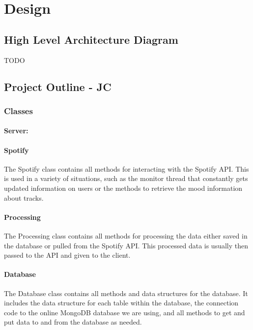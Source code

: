 \documentclass[11pt]{report}
\begin{document}
\chapter{Design}

\section{High Level Architecture Diagram}

TODO

\section{Project Outline - JC}

\subsection{Classes}


\subsubsection{Server:}

\hrulefill

\subsubsection{Spotify}
The Spotify class contains all methods for interacting with the Spotify API. This is used in a variety of situations, such as the monitor thread that constantly gets updated information on users or the methods to retrieve the mood information about tracks. 

\subsubsection{Processing}
The Processing class contains all methods for processing the data either saved in the database or pulled from the Spotify API. This processed data is usually then passed to the API and given to the client.

\subsubsection{Database}
The Database class contains all methods and data structures for the database. It includes the data structure for each table within the database, the connection code to the online MongoDB database we are using, and all methods to get and put data to and from the database as needed.
\end{document}
